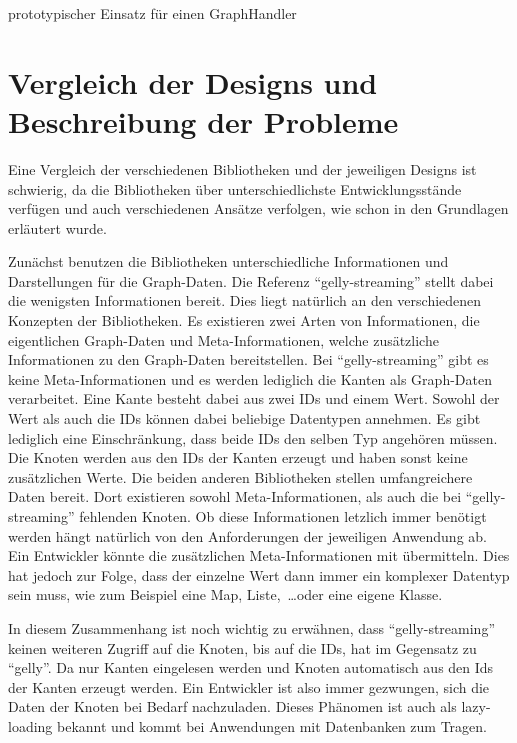 \begin{listing}
\inputminted[breaklines=true]{java}{../material/code/GephiGraphHandler.java}
\caption{prototypischer Einsatz für einen GraphHandler}
\label{code:GephiGraphHandler}
\end{listing}

\section{Vergleich der Designs und Beschreibung der Probleme}
Eine Vergleich der verschiedenen Bibliotheken und der jeweiligen Designs ist
schwierig, da die Bibliotheken über unterschiedlichste Entwicklungsstände
verfügen und auch verschiedenen Ansätze verfolgen, wie schon in den Grundlagen
erläutert wurde.

Zunächst benutzen die Bibliotheken unterschiedliche Informationen und Darstellungen
für die Graph-Daten. Die Referenz \enquote{gelly-streaming} stellt dabei die
wenigsten Informationen bereit. Dies liegt natürlich an den verschiedenen
Konzepten der Bibliotheken. Es existieren zwei Arten von Informationen, die
eigentlichen Graph-Daten und Meta-Informationen, welche zusätzliche Informationen
zu den Graph-Daten bereitstellen. Bei \enquote{gelly-streaming} gibt es keine
Meta-Informationen und es werden lediglich die Kanten als Graph-Daten verarbeitet.
Eine Kante besteht dabei aus zwei IDs und einem Wert. Sowohl der Wert als auch
die IDs können dabei beliebige Datentypen annehmen. Es gibt lediglich eine
Einschränkung, dass beide IDs den selben Typ angehören müssen. Die Knoten werden
aus den IDs der Kanten erzeugt und haben sonst keine zusätzlichen Werte. Die
beiden anderen Bibliotheken stellen umfangreichere Daten bereit. Dort existieren
sowohl Meta-Informationen, als auch die bei \enquote{gelly-streaming} fehlenden
Knoten. Ob diese Informationen letzlich immer benötigt werden hängt natürlich
von den Anforderungen der jeweiligen Anwendung ab. Ein Entwickler könnte die
zusätzlichen Meta-Informationen mit übermitteln. Dies hat jedoch zur Folge, dass
der einzelne Wert dann immer ein komplexer Datentyp sein muss, wie zum Beispiel
eine Map, Liste,~\dots oder eine eigene Klasse.

In diesem Zusammenhang ist noch wichtig zu erwähnen, dass \enquote{gelly-streaming}
keinen weiteren Zugriff auf die Knoten, bis auf die IDs, hat im Gegensatz zu \enquote{gelly}.
Da nur Kanten eingelesen werden und Knoten automatisch aus den Ids der Kanten
erzeugt werden. Ein Entwickler ist also immer gezwungen, sich die Daten der
Knoten bei Bedarf nachzuladen. Dieses Phänomen ist auch als lazy-loading bekannt
und kommt bei Anwendungen mit Datenbanken zum Tragen.

